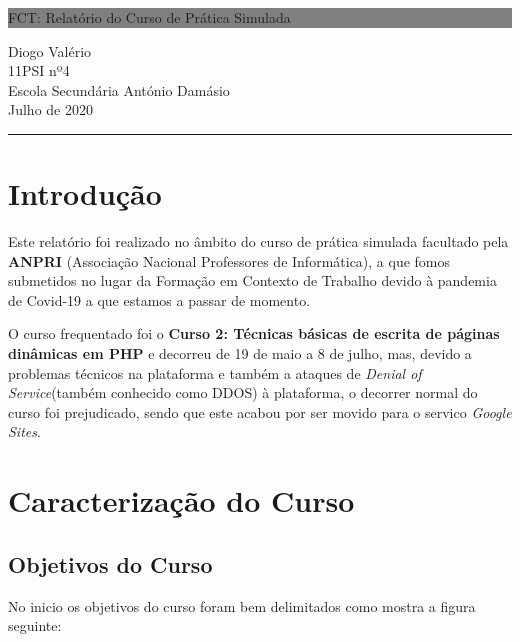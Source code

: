 \documentclass[12pt]{article}
\begin{document}
\begin{titlepage}

	\colorbox{grey}{
		\parbox[t]{0.93\textwidth}{ %
			\parbox[t]{0.91\textwidth}{ %
				\raggedleft
				\fontsize{50pt}{80pt}\selectfont
				\vspace{0.5cm}

				FCT: Relatório do Curso de Prática Simulada\\


				\vspace{0.5cm}
			}
		}
	}
	\vfill

	\parbox[t]{0.93\textwidth}{
		\raggedleft
		\large
		{\Large Diogo Valério}\\[4pt]
		11PSI nº4\\
		Escola Secundária António Damásio\\[4pt]
    Julho de 2020\\[4pt]
		\hfill\rule{0.6\linewidth}{1pt}
	}
\end{titlepage}


\tableofcontents
\newpage

\section{Introdução}
Este relatório foi realizado no âmbito do curso de prática simulada facultado pela \textbf{ANPRI} (Associação Nacional Professores de Informática), a que fomos submetidos no lugar da Formação em Contexto de Trabalho devido à pandemia de Covid-19 a que estamos a passar de momento.

O curso frequentado foi o \textbf{Curso 2: Técnicas básicas de escrita de páginas dinâmicas em PHP} e decorreu de 19 de maio a 8 de julho, mas, devido a problemas técnicos na plataforma e também a ataques de  \textit{Denial of Service}(também conhecido como DDOS) à plataforma, o decorrer normal do curso foi prejudicado, sendo que este acabou por ser movido para o servico \textit{Google Sites}.


\section{Caracterização do Curso}
\subsection{Objetivos do Curso}
No inicio os objetivos do curso foram bem delimitados como mostra a figura seguinte:
\end{document}
